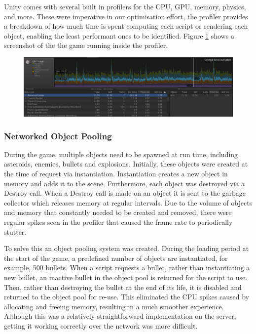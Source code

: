 \documentclass[a4paper,11pt]{article}
\begin{document}
Unity comes with several built in profilers for the CPU, GPU, memory, physics, and more. These were imperative in our optimisation effort, the profiler provides a breakdown of how much time is spent computing each script or rendering each object, enabling the least performant ones to be identified. Figure \ref{fig:profiler} shows a screenshot of the the game running inside the profiler.

\begin{figure}[ht]
	\centering
	\includegraphics[width=\textwidth]{images/profiler}
    \label{fig:profiler}
\end{figure}

\subsubsection{Networked Object Pooling}
During the game, multiple objects need to be spawned at run time, including asteroids, enemies, bullets and explosions. Initially, these objects were created at the time of request via instantiation. Instantiation creates a new object in memory and adds it to the scene. Furthermore, each object was destroyed via a Destroy call. When a Destroy call is made on an object it is sent to the garbage collector which releases memory at regular intervals. Due to the volume of objects and memory that constantly needed to be created and removed, there were regular spikes seen in the profiler that caused the frame rate to periodically stutter.

To solve this an object pooling system was created. During the loading period at the start of the game, a predefined number of objects are instantiated, for example, 500 bullets. When a script requests a bullet, rather than instantiating a new bullet, an inactive bullet in the object pool is returned for the script to use. Then, rather than destroying the bullet at the end of its life, it is disabled and returned to the object pool for re-use. This eliminated the CPU spikes caused by allocating and freeing memory, resulting in a much smoother experience. Although this was a relatively straightforward implementation on the server, getting it working correctly over the network was more difficult. 
\end{document}
